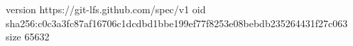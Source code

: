 version https://git-lfs.github.com/spec/v1
oid sha256:c0c3a3fc87af16706c1dcdbd1bbe199ef77f8253e08bebdb235264431f27c063
size 65632
